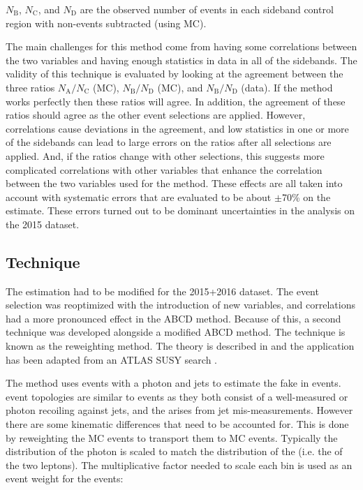 \noindent $N_\text{B}$, $N_\text{C}$, and $N_\text{D}$ are the observed number of events in each sideband control region with non-\Zjets events subtracted (using MC).

The main challenges for this method come from having some correlations between the two variables and having enough statistics in data in all of the sidebands. The validity of this technique is evaluated by looking at the agreement between the three ratios $N_\text{A}/N_\text{C}$ (MC), $N_\text{B}/N_\text{D}$ (MC), and $N_\text{B}/N_\text{D}$ (data). If the method works perfectly then these ratios will agree. In addition, the agreement of these ratios should agree as the other event selections are applied. However, correlations cause deviations in the agreement, and low statistics in one or more of the sidebands can lead to large errors on the ratios after all selections are applied. And, if the ratios change with other selections, this suggests more complicated correlations with other variables that enhance the correlation between the two variables used for the method. These effects are all taken into account with systematic errors that are evaluated to be about $\pm$70\% on the \Zjets estimate. These errors turned out to be dominant uncertainties in the analysis on the 2015 dataset.

\subsection{\gjets Technique}
\label{sec:gjets}

The \Zjets estimation had to be modified for the 2015+2016 dataset. The event selection was reoptimized with the introduction of new variables, and correlations had a more pronounced effect in the ABCD method. Because of this, a second technique was developed alongside a modified ABCD method. The technique is known as the \gjets reweighting method. The theory is described in \cite{Ask:2011xf} and the application has been adapted from an ATLAS SUSY search \cite{Galster:2151990}.

The \gjets method uses events with a photon and jets to estimate the fake \etmiss in \Zjets events. \gjets event topologies are similar to \Zjets events as they both consist of a well-measured \Z or photon recoiling against jets, and the \etmiss arises from jet mis-measurements. However there are some kinematic differences that need to be accounted for. This is done by reweighting the \gjets MC events to transport them to \Zjets MC events. Typically the \pt distribution of the photon is scaled to match the \pt distribution of the \Z (i.e. the \pt of the two leptons). The multiplicative factor needed to scale each \pt bin is used as an event weight for the \gjets events: 


